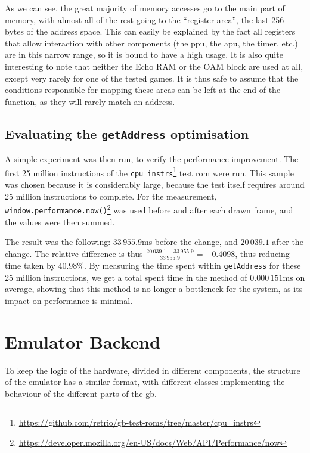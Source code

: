 \documentclass[11pt]{report}
\newcommand{\ftnt}[1]{\footnote{\url{#1}}}
\begin{document}
As we can see, the great majority of memory accesses go to the main part of memory, with almost all of the rest going to the ``register area'', the last 256 bytes of the address space. This can easily be explained by the fact all registers that allow interaction with other components (the \gls{ppu}, the \gls{apu}, the timer, etc.) are in this narrow range, so it is bound to have a high usage. It is also quite interesting to note that neither the Echo RAM or the OAM block are used at all, except very rarely for one of the tested games. It is thus safe to assume that the conditions responsible for mapping these areas can be left at the end of the function, as they will rarely match an address.

\subsection{Evaluating the \texttt{getAddress} optimisation}

A simple experiment was then run, to verify the performance improvement. The first 25 million instructions of the \texttt{cpu\_instrs}\ftnt{https://github.com/retrio/gb-test-roms/tree/master/cpu_instrs} test \gls{rom} were run. This sample was chosen because it is considerably large, because the test itself requires around 25 million instructions to complete. For the measurement, \texttt{window.performance.now()}\ftnt{https://developer.mozilla.org/en-US/docs/Web/API/Performance/now} was used before and after each drawn frame, and the values were then summed.

The result was the following: $33\,955.9$ms before the change, and $20\,039.1$ after the change. The relative difference is thus $\frac{20\,039.1-33\,955.9}{33\,955.9}=-0.4098$, thus reducing time taken by $40.98\%$. By measuring the time spent within \texttt{getAddress} for these 25 million instructions, we get a total spent time in the method of $0.000\,151$ms on average, showing that this method is no longer a bottleneck for the system, as its impact on performance is minimal.

\section{Emulator Backend}

To keep the logic of the hardware, divided in different components, the structure of the emulator has a similar format, with different classes implementing the behaviour of the different parts of the \glsdesc{gb}.
\end{document}
